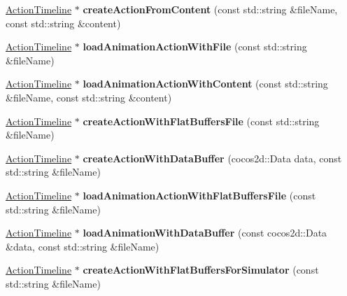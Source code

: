 \begin{DoxyCompactItemize}
\hyperlink{classActionTimeline}{Action\+Timeline} $\ast$ {\bfseries create\+Action\+From\+Content} (const std\+::string \&file\+Name, const std\+::string \&content)
\item 
\mbox{\label{classActionTimelineCache_a33dfacc1ce7c95997f6e624f187e0af9}} 
\hyperlink{classActionTimeline}{Action\+Timeline} $\ast$ {\bfseries load\+Animation\+Action\+With\+File} (const std\+::string \&file\+Name)
\item 
\mbox{\label{classActionTimelineCache_a1bbb03415b237c5d00708c64bfebd87d}} 
\hyperlink{classActionTimeline}{Action\+Timeline} $\ast$ {\bfseries load\+Animation\+Action\+With\+Content} (const std\+::string \&file\+Name, const std\+::string \&content)
\item 
\mbox{\label{classActionTimelineCache_ab788f904c9272a4dd50366f3924e8918}} 
\hyperlink{classActionTimeline}{Action\+Timeline} $\ast$ {\bfseries create\+Action\+With\+Flat\+Buffers\+File} (const std\+::string \&file\+Name)
\item 
\mbox{\label{classActionTimelineCache_a0ebd3086be614241e290e2ea22f9a4ba}} 
\hyperlink{classActionTimeline}{Action\+Timeline} $\ast$ {\bfseries create\+Action\+With\+Data\+Buffer} (cocos2d\+::\+Data data, const std\+::string \&file\+Name)
\item 
\mbox{\label{classActionTimelineCache_a50dfc8cff178303963f7363a47eba572}} 
\hyperlink{classActionTimeline}{Action\+Timeline} $\ast$ {\bfseries load\+Animation\+Action\+With\+Flat\+Buffers\+File} (const std\+::string \&file\+Name)
\item 
\mbox{\label{classActionTimelineCache_a5c801acb7bcf74cd4345798312fcaaf6}} 
\hyperlink{classActionTimeline}{Action\+Timeline} $\ast$ {\bfseries load\+Animation\+With\+Data\+Buffer} (const cocos2d\+::\+Data \&data, const std\+::string \&file\+Name)
\item 
\mbox{\label{classActionTimelineCache_a09cf01856d3257368929cba3b8a0988d}} 
\hyperlink{classActionTimeline}{Action\+Timeline} $\ast$ {\bfseries create\+Action\+With\+Flat\+Buffers\+For\+Simulator} (const std\+::string \&file\+Name)
\end{DoxyCompactItemize}
